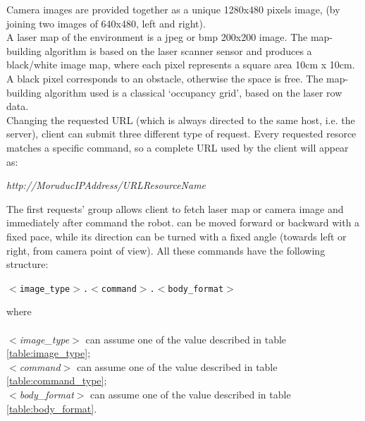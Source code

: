 Camera images are provided together as a unique 1280x480 pixels image, 
(by joining two images of 640x480, left and right).
\\
A laser map of the environment is a jpeg or bmp 200x200 image. The map-building
algorithm is based on the laser scanner sensor and produces a black/white image
map, where each pixel represents a square area 10cm x 10cm. A black pixel corresponds
to an obstacle, otherwise the space is free. The map-building algorithm used is a
classical `occupancy grid', based on the laser row data.
\\
Changing the requested URL (which is always directed to the same host,
i.e. the \morduc{} server), client can submit three different type of request.
Every requested resorce matches a specific command, so a complete URL used
by the client will appear as:

\begin{center}
  \textit{http://MoruducIPAddress/URLResourceName}
\end{center}

The first requests' group allows client to fetch laser map or camera image and
immediately after command the robot. \morduc{} can be moved
forward or backward with a fixed pace, while its direction can be turned
with a fixed angle (towards left or right, from camera point
of view). All these commands have the following structure:

\begin{center}
  \texttt{$<$image\_type$>$.$<$command$>$.$<$body\_format$>$}
\end{center}

where \\ \\
\textit{$<$image\_type$>$} can assume one of the value described in table
\ref{table:image_type};\\
\textit{$<$command$>$} can assume one of the value described in table
\ref{table:command_type};\\
\textit{$<$body\_format$>$} can assume one of the value described in table
\ref{table:body_format}. \\

